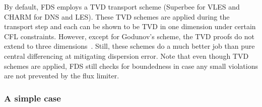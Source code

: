 By default, FDS employs a TVD transport scheme (Superbee \cite{Roe:1986} for VLES and CHARM \cite{Zhou:1995} for DNS and LES). These TVD schemes are applied during the transport step and each can be shown to be TVD in one dimension under certain CFL constraints.  However, except for Godunov's scheme, the TVD proofs do not extend to three dimensions~\cite{Toro}.  Still, these schemes do a much better job than pure central differencing at mitigating dispersion error.  Note that even though TVD schemes are applied, FDS still checks for boundedness in case any small violations are not prevented by the flux limiter.

\subsubsection*{A simple case}

